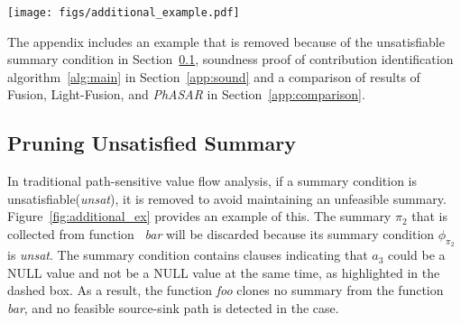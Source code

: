 \appendix


\begin{figure*}[t]
    \centering
    \texttt{[image: figs/additional\_example.pdf]}
    \caption{
    An illustration example where the summary $\pi_{2}$ is removed due to the unsatisfiable summary condition $\phi_{\pi_{2}}$.
    Bottom-up analysis for the code shown in (a).
    The (b) shows the corresponding program dependence graph (PDG). 
    (c) shows the function summaries collected during the bottom-up analysis.}
    \label{fig:additional_ex}
    \vspace{-0.4cm}
\end{figure*}

The appendix includes an example that is removed because of the unsatisfiable summary condition in Section~\ref{app:unsat-summary},
soundness proof of contribution identification algorithm~\ref{alg:main}
in Section~\ref{app:sound} and a comparison of results of Fusion, Light-Fusion, and \textit{PhASAR} in Section~\ref{app:comparison}.

\subsection{Pruning Unsatisfied Summary}
\label{app:unsat-summary}
In traditional path-sensitive value flow analysis, if a summary condition is unsatisfiable(\textit{unsat}), it is removed to avoid maintaining an unfeasible summary.
Figure~\ref{fig:additional_ex} provides an example of this.
The summary $\pi_{2}$ that is collected from function ~\textit{bar} will be discarded because its summary condition $\phi_{\pi_{2}}$ is \textit{unsat}.
The summary condition contains clauses indicating that $a_3$ could be a NULL value and not be a NULL value at the same time, as highlighted in the dashed box.
As a result, the function \textit{foo} clones no summary from the function \textit{bar}, and no feasible source-sink path is detected in the case.


